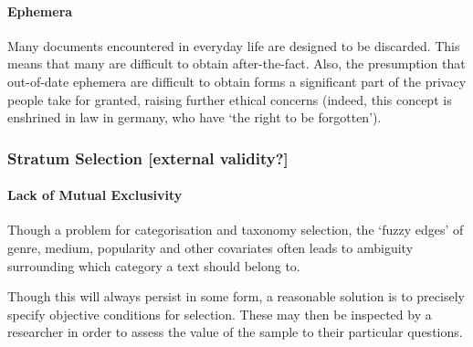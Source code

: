 \paragraph{Ephemera}
Many documents encountered in everyday life are designed to be discarded. This means that many are difficult to obtain after-the-fact.  Also, the presumption that out-of-date ephemera are difficult to obtain forms a significant part of the privacy people take for granted, raising further ethical concerns (indeed, this concept is enshrined in law in germany, who have `the right to be forgotten').


\sepline


\subsubsection{Stratum Selection [external validity?]}



\paragraph{Lack of Mutual Exclusivity}
Though a problem for categorisation and taxonomy selection, the `fuzzy edges' of genre, medium, popularity and other covariates often leads to ambiguity surrounding which category a text should belong to.

Though this will always persist in some form, a reasonable solution is to precisely specify objective conditions for selection. These may then be inspected by a researcher in order to assess the value of the sample to their particular questions.

